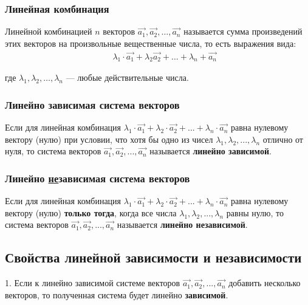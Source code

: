 \documentclass[12pt, fleqn]{extarticle}
\begin{document}
\subsubsection*{Линейная комбинация}
Линейной комбинацией \(n\) векторов \(\overrightarrow{a_1}, \overrightarrow{a_2}, \ldots, \overrightarrow{a_n}\) называется сумма произведений этих векторов на произвольные вещественные числа, то есть выражения вида:
\begin{align*}
     &  &
    \lambda_1 \cdot \overrightarrow{a_1} + \lambda_2 \overrightarrow{a_2} + \ldots + \lambda_n + \overrightarrow{a_n}
\end{align*}

где \(\lambda_1, \lambda_2, \ldots, \lambda_n\) — любые действительные числа.

\subsubsection*{Линейно зависимая система векторов}
Если для линейная комбинация \(\lambda_1 \cdot \overrightarrow{a_1} + \lambda_2 \cdot \overrightarrow{a_2} + ... + \lambda_n \cdot \overrightarrow{a_n}\) равна нулевому вектору (нулю) при условии, что хотя бы одно из чисел \(\lambda_1, \lambda_2, ..., \lambda_n\) отлично от нуля, то система векторов \(\overrightarrow{a_1}, \overrightarrow{a_2}, ..., \overrightarrow{a_n}\) называется \textbf{линейно зависимой}.

\subsubsection*{Линейно \underline{не}зависимая система векторов}
Если для линейная комбинация \(\lambda_1 \cdot \overrightarrow{a_1} + \lambda_2 \cdot \overrightarrow{a_2} + ... + \lambda_n \cdot \overrightarrow{a_n}\) равна нулевому вектору (нулю) \textbf{только тогда}, когда все числа \(\lambda_1, \lambda_2, ..., \lambda_n\) равны нулю, то система векторов \(\overrightarrow{a_1}, \overrightarrow{a_2}, ..., \overrightarrow{a_n}\) называется \textbf{линейно независимой}.

\subsection*{Свойства линейной зависимости и независимости}

1. Если к линейно зависимой системе векторов \(\overrightarrow{a_1}, \overrightarrow{a_2}, ..., \overrightarrow{a_n}\) добавить несколько векторов, то полученная система будет линейно \textbf{зависимой}.
\end{document}
